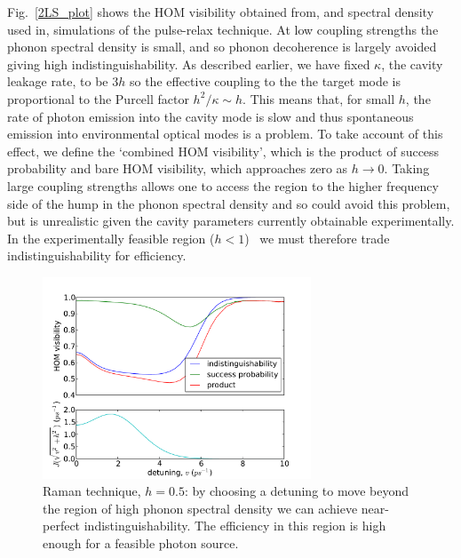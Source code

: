 Fig.~\ref{2LS_plot} shows the HOM visibility obtained from, and spectral density used in, simulations of the pulse-relax technique. At low coupling strengths the phonon spectral density is small, and so phonon decoherence is largely avoided giving high indistinguishability. As described earlier, we have fixed $\kappa$, the cavity leakage rate, to be $3 h$ so the effective coupling to the the target mode is proportional to the Purcell factor $h^2/\kappa \sim h$. This means that, for small $h$, the rate of photon emission into the cavity mode is slow and thus spontaneous emission into environmental optical modes is a problem. To take account of this effect, we define the `combined HOM visibility', which is the product of success probability and bare HOM visibility, which approaches zero as $h \to 0$. Taking large coupling strengths allows one to access the region to the higher frequency side of the hump in the phonon spectral density and so could avoid this problem, but is unrealistic given the cavity parameters currently obtainable experimentally. In the experimentally feasible region ($h<1$)~\cite{vuckovic:12} we must therefore trade indistinguishability for efficiency.

\begin{figure}[htb]
  \begin{center}
  \includegraphics[width=8cm]{assets/raman_plot.pdf}
  \end{center}
  \caption{Raman technique, $h = 0.5$: by choosing a detuning to move beyond the region of high phonon spectral density we can achieve near-perfect indistinguishability. The efficiency in this region is high enough for a feasible photon source.}
  \label{raman_plot}
\end{figure}


